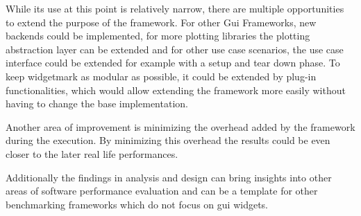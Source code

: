 While its use at this point is relatively narrow, there are multiple
opportunities to extend the purpose of the framework. For other Gui Frameworks,
new backends could be implemented, for more plotting libraries the plotting
abstraction layer can be extended and for other use case scenarios, the use case
interface could be extended for example with a setup and tear down phase.
To keep widgetmark as modular as possible, it could be extended by plug-in
functionalities, which would allow extending the framework more easily without
having to change the base implementation.

Another area of improvement is minimizing the overhead added by the framework
during the execution. By minimizing this overhead the results could be even
closer to the later real life performances.

Additionally the findings in analysis and design can bring insights into other
areas of software performance evaluation and can be a template for other
benchmarking frameworks which do not focus on \gls{gui} widgets.

